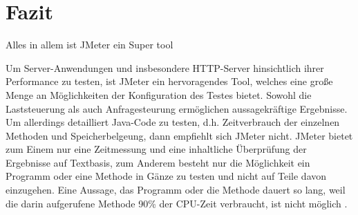 \documentclass[a4paper,12pt]{article}
\begin{document}
\section{Fazit}
Alles in allem ist JMeter ein Super tool

Um Server-Anwendungen und insbesondere HTTP-Server hinsichtlich ihrer Performance zu testen, ist JMeter ein hervoragendes Tool, welches eine große Menge an Möglichkeiten der Konfiguration des Testes bietet. Sowohl die Laststeuerung als auch Anfragesteurung ermöglichen aussagekräftige Ergebnisse. Um allerdings detailliert Java-Code zu testen, d.h. Zeitverbrauch der einzelnen Methoden und Speicherbelgeung, dann empfiehlt sich JMeter nicht. JMeter bietet zum Einem nur eine Zeitmessung und eine inhaltliche Überprüfung der Ergebnisse auf Textbasis, zum Anderem besteht nur die Möglichkeit ein Programm oder eine Methode in Gänze zu testen und nicht auf Teile davon einzugehen. Eine Aussage, das Programm oder die Methode dauert so lang, weil die darin aufgerufene Methode 90\% der CPU-Zeit verbraucht, ist nicht möglich \cite{online:performanceTools}.


\pagebreak
\thispagestyle{empty}


\end{document}
